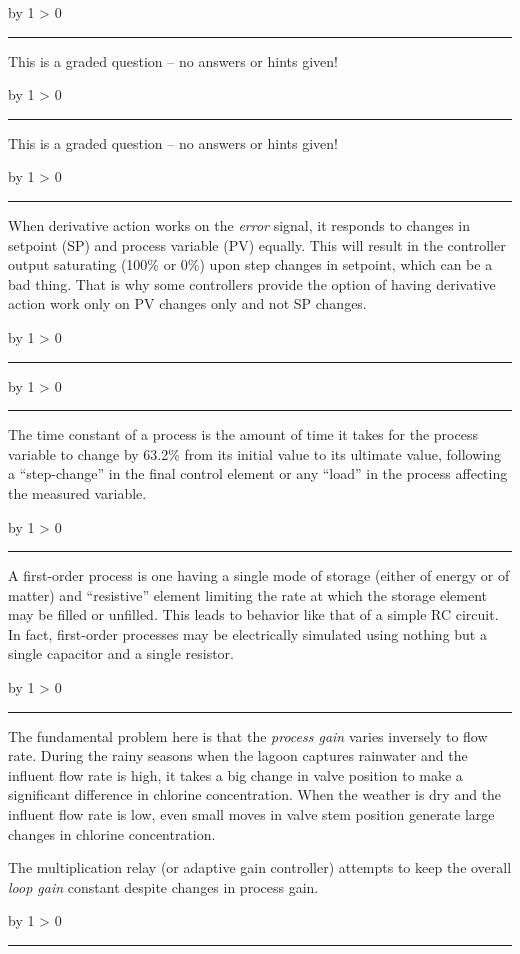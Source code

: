 \documentclass[12pt,a4paper]{article}
\def\svar{
           \advance\answnum by 1
           \ifnum \answnum > 0
                \hrule
                \vskip 3pt
                \leftline{Svar \the\answnum}
                \vskip 3pt \fi}
\begin{document}
\vskip 10pt \filbreak 
\svar{} 

This is a graded question -- no answers or hints given!

\vskip 10pt \filbreak 
\svar{} 

This is a graded question -- no answers or hints given!

\vskip 10pt \filbreak 
\svar{} 

When derivative action works on the {\it error} signal, it responds to changes in setpoint (SP) and process variable (PV) equally.  This will result in the controller output saturating (100\% or 0\%) upon step changes in setpoint, which can be a bad thing.  That is why some controllers provide the option of having derivative action work only on PV changes only and not SP changes.

\vskip 10pt \filbreak 
\svar{} 


\vskip 10pt \filbreak 
\svar{} 

The time constant of a process is the amount of time it takes for the process variable to change by 63.2\% from its initial value to its ultimate value, following a ``step-change'' in the final control element or any ``load'' in the process affecting the measured variable.

\vskip 10pt \filbreak 
\svar{} 

A first-order process is one having a single mode of storage (either of energy or of matter) and ``resistive'' element limiting the rate at which the storage element may be filled or unfilled.  This leads to behavior like that of a simple RC circuit.  In fact, first-order processes may be electrically simulated using nothing but a single capacitor and a single resistor.

\vskip 10pt \filbreak 
\svar{} 

The fundamental problem here is that the {\it process gain} varies inversely to flow rate.  During the rainy seasons when the lagoon captures rainwater and the influent flow rate is high, it takes a big change in valve position to make a significant difference in chlorine concentration.  When the weather is dry and the influent flow rate is low, even small moves in valve stem position generate large changes in chlorine concentration.

\vskip 10pt

The multiplication relay (or adaptive gain controller) attempts to keep the overall {\it loop gain} constant despite changes in process gain.

\vskip 10pt \filbreak 
\svar{} 
\end{document}
